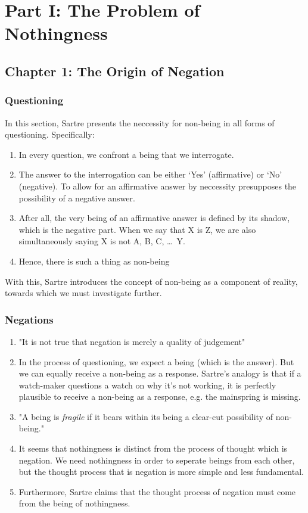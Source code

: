 \section{Part I: The Problem of Nothingness}

\subsection{Chapter 1: The Origin of Negation}

\subsubsection{Questioning}
In this section, Sartre presents the neccessity for non-being in all forms of questioning. Specifically:

\begin{enumerate}
  \item In every question, we confront a being that we interrogate.
  \item The answer to the interrogation can be either `Yes' (affirmative) or `No' (negative). To allow for an affirmative answer by neccessity presupposes the possibility of a negative answer.
  \item After all, the very being of an affirmative answer is defined by its shadow, which is the negative part. When we say that X is Z, we are also simultaneously saying X is not A, B, C, \ldots\ Y.
  \item Hence, there is such a thing as non-being
\end{enumerate}

\noindent
With this, Sartre introduces the concept of non-being as a component of reality, towards which we must investigate further.

\subsubsection{Negations}

\begin{enumerate}
  \item "It is not true that negation is merely a quality of judgement" \autocite[38]{sartre}
  \item In the process of questioning, we expect a being (which is the answer). But we can equally receive a non-being as a response. Sartre's analogy is that if a watch-maker questions a watch on why it's not working, it is perfectly plausible to receive a non-being as a response, e.g. the mainspring is missing.
  \item "A being is \emph{fragile} if it bears within its being a clear-cut possibility of non-being." \autocite[40]{sartre}
  \item It seems that nothingness is distinct from the process of thought which is negation. We need nothingness in order to seperate beings from each other, but the thought process that is negation is more simple and less fundamental.
  \item Furthermore, Sartre claims that the thought process of negation must come from the being of nothingness.
\end{enumerate}
